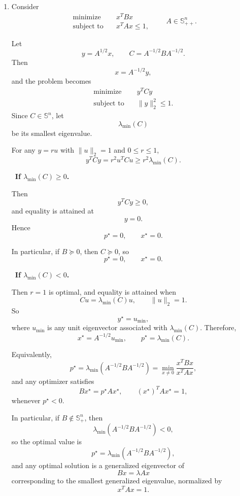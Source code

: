 \documentclass[11pt,letter,notitlepage]{article}
\theoremstyle{definition}
\begin{document}
\begin{solution}
\begin{enumerate}[label=(\alph*)]
Let
\[
y=x-x_c.
\]
Then the problem becomes
\[
\begin{aligned}
\text{minimize}\quad & c^T(y+x_c)=c^Ty+c^Tx_c\\
\text{subject to}\quad & y^T A y\le 1.
\end{aligned}
\]
By part (a),
\[
y^\star=-\frac{A^{-1}c}{\sqrt{c^T A^{-1}c}}.
\]
Hence
\[
x^\star
=
x_c-\frac{A^{-1}c}{\sqrt{c^T A^{-1}c}},
\]
and
\[
p^\star
=
c^T x_c-\sqrt{c^T A^{-1}c}.
\]

\medskip

\item
Consider
\[
\begin{aligned}
\text{minimize}\quad & x^T B x\\
\text{subject to}\quad & x^T A x\le 1,
\end{aligned}
\qquad A\in\mathbb S_{++}^n.
\]

Let
\[
y=A^{1/2}x,
\qquad
C=A^{-1/2}BA^{-1/2}.
\]
Then
\[
x=A^{-1/2}y,
\]
and the problem becomes
\[
\begin{aligned}
\text{minimize}\quad & y^T C y\\
\text{subject to}\quad & \|y\|_2^2\le 1.
\end{aligned}
\]
Since \(C\in\mathbb S^n\), let
\[
\lambda_{\min}(C)
\]
be its smallest eigenvalue.

For any \(y=r u\) with \(\|u\|_2=1\) and \(0\le r\le 1\),
\[
y^T C y=r^2 u^T C u\ge r^2 \lambda_{\min}(C).
\]

\ \textbf{If \(\lambda_{\min}(C)\ge 0\).}

Then
\[
y^T C y\ge 0,
\]
and equality is attained at
\[
y=0.
\]
Hence
\[
p^\star=0,
\qquad
x^\star=0.
\]

In particular, if \(B\succeq 0\), then \(C\succeq 0\), so
\[
p^\star=0,
\qquad
x^\star=0.
\]

\ \textbf{If \(\lambda_{\min}(C)<0\).}

Then \(r=1\) is optimal, and equality is attained when
\[
Cu=\lambda_{\min}(C)u,
\qquad
\|u\|_2=1.
\]
So
\[
y^\star=u_{\min},
\]
where \(u_{\min}\) is any unit eigenvector associated with \(\lambda_{\min}(C)\). Therefore,
\[
x^\star=A^{-1/2}u_{\min},
\qquad
p^\star=\lambda_{\min}(C).
\]

Equivalently,
\[
p^\star
=
\lambda_{\min}\!\left(A^{-1/2}BA^{-1/2}\right)
=
\min_{x\neq 0}\frac{x^T B x}{x^T A x},
\]
and any optimizer satisfies
\[
Bx^\star=p^\star A x^\star,
\qquad
(x^\star)^T A x^\star=1,
\]
whenever \(p^\star<0\).

In particular, if \(B\notin\mathbb S_+^n\), then
\[
\lambda_{\min}\!\left(A^{-1/2}BA^{-1/2}\right)<0,
\]
so the optimal value is
\[
p^\star=\lambda_{\min}\!\left(A^{-1/2}BA^{-1/2}\right),
\]
and any optimal solution is a generalized eigenvector of
\[
Bx=\lambda A x
\]
corresponding to the smallest generalized eigenvalue, normalized by
\[
x^T A x=1.
\]

\end{enumerate}

\end{solution}
\end{document}
